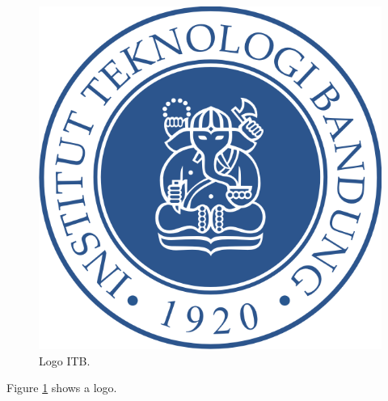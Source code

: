 \documentclass{article}
\begin{document}
\begin{figure}[b!]
  \includegraphics[width=\linewidth]{logo.png}
  \caption{Logo ITB.}
  \label{fig:logoitb}
\end{figure}

Figure \ref{fig:logoitb} shows a logo.
\end{document}
